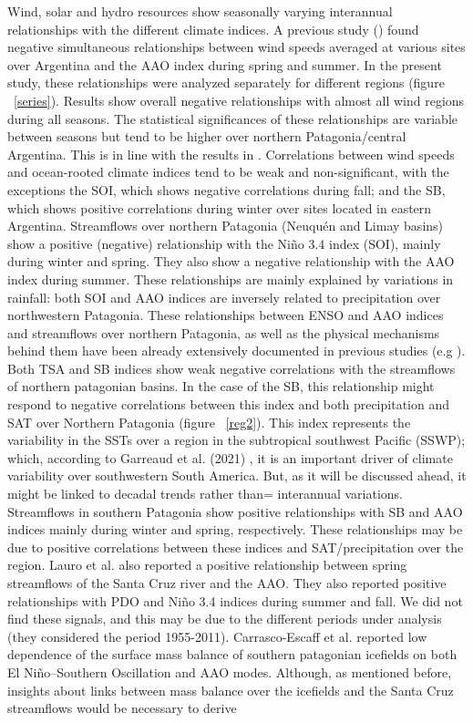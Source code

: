 \documentclass[AMA,Times1COL]{WileyNJDv5} %
\begin{document}
\begin{linenumbers}
Wind, solar and hydro resources show seasonally varying interannual relationships with the different climate indices. A previous study (\cite{bianchi2022assessing}) found negative simultaneous relationships between wind speeds averaged at various sites over Argentina and the AAO index during spring and summer. In the present study, these relationships were analyzed separately for different regions (figure ~\ref{series}). Results show overall negative relationships with almost all wind regions during all seasons. The statistical significances of these relationships are variable between seasons but tend to be higher over northern Patagonia/central Argentina. This is in line with the results in \cite{bianchi2017large}. Correlations between wind speeds and ocean-rooted climate indices tend to be weak and non-significant, with the exceptions the SOI, which shows negative correlations during fall; and the SB, which shows positive correlations during winter over sites located in eastern Argentina. Streamflows over northern Patagonia (Neuquén and Limay basins) show a positive (negative) relationship with the Niño 3.4 index (SOI), mainly during winter and spring. They also show a negative relationship with the AAO index during summer. These relationships are mainly explained by variations in rainfall: both SOI and AAO indices are inversely related to precipitation over northwestern Patagonia. These relationships between ENSO and AAO indices and streamflows over northern Patagonia, as well as the physical mechanisms behind them have been already extensively documented in previous studies (e.g \cite{gonzalez2010statistical, masiokas2006snowpack, lauro2019streamflow, camposenso}). Both TSA and SB indices show weak negative correlations with the streamflows of northern patagonian basins. In the case of the SB, this relationship might respond to negative correlations between this index and both precipitation and SAT over Northern Patagonia (figure ~\ref{reg2}). This index represents the variability in the SSTs over a region in the subtropical southwest Pacific (SSWP); which, according to Garreaud et al. (2021) \cite{garreaud2021south}, it is an important driver of climate variability over southwestern South America. But, as it will be discussed ahead, it might be linked to decadal trends rather than= interannual variations. Streamflows in southern Patagonia show positive relationships with SB and AAO indices mainly during winter and spring, respectively. These relationships may be due to positive correlations between these indices and SAT/precipitation over the region. Lauro et al. \cite{lauro2019streamflow} also reported a positive relationship between spring streamflows of the Santa Cruz river and the AAO. They also reported positive relationships with PDO and Niño 3.4 indices during summer and fall. We did not find these signals, and this may be due to the different periods under analysis (they considered the period 1955-2011). Carrasco-Escaff et al. \cite{carrasco2022climatic} reported low dependence of the surface mass balance of southern patagonian icefields on both El Niño–Southern Oscillation and AAO modes. Although, as mentioned before, insights about links between mass balance over the icefields and the Santa Cruz streamflows would be necessary to derive 
\end{linenumbers}
\end{document}
